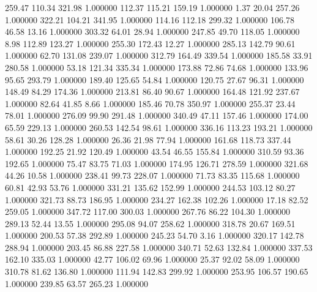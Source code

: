     259.47    110.34    321.98  1.000000
    112.37    115.21    159.19  1.000000
      1.37     20.04    257.26  1.000000
    322.21    104.21    341.95  1.000000
    114.16    112.18    299.32  1.000000
    106.78     46.58     13.16  1.000000
    303.32     64.01     28.94  1.000000
    247.85     49.70    118.05  1.000000
      8.98    112.89    123.27  1.000000
    255.30    172.43     12.27  1.000000
    285.13    142.79     90.61  1.000000
     62.70    131.08    239.07  1.000000
    312.79    164.49    339.54  1.000000
    185.58     33.91    280.58  1.000000
     53.18    121.34    335.34  1.000000
    173.88     72.86     74.68  1.000000
    133.96     95.65    293.79  1.000000
    189.40    125.65     54.84  1.000000
    120.75     27.67     96.31  1.000000
    148.49     84.29    174.36  1.000000
    213.81     86.40     90.67  1.000000
    164.48    121.92    237.67  1.000000
     82.64     41.85      8.66  1.000000
    185.46     70.78    350.97  1.000000
    255.37     23.44     78.01  1.000000
    276.09     99.90    291.48  1.000000
    340.49     47.11    157.46  1.000000
    174.00     65.59    229.13  1.000000
    260.53    142.54     98.61  1.000000
    336.16    113.23    193.21  1.000000
     58.61     30.26    128.28  1.000000
     26.36     21.98     77.94  1.000000
    161.68    118.73    337.44  1.000000
    192.25     21.92    120.49  1.000000
     43.54     46.55    155.84  1.000000
    310.59     93.36    192.65  1.000000
     75.47     83.75     71.03  1.000000
    174.95    126.71    278.59  1.000000
    321.68     44.26     10.58  1.000000
    238.41     99.73    228.07  1.000000
     71.73     83.35    115.68  1.000000
     60.81     42.93     53.76  1.000000
    331.21    135.62    152.99  1.000000
    244.53    103.12     80.27  1.000000
    321.73     88.73    186.95  1.000000
    234.27    162.38    102.26  1.000000
     17.18     82.52    259.05  1.000000
    347.72    117.00    300.03  1.000000
    267.76     86.22    104.30  1.000000
    289.13     52.44     13.55  1.000000
    295.08     94.07    258.62  1.000000
    318.78     20.67    169.51  1.000000
    200.53     57.38    292.89  1.000000
    245.23     54.70      3.16  1.000000
    320.17    142.78    288.94  1.000000
    203.45     86.88    227.58  1.000000
    340.71     52.63    132.84  1.000000
    337.53    162.10    335.03  1.000000
     42.77    106.02     69.96  1.000000
     25.37     92.02     58.09  1.000000
    310.78     81.62    136.80  1.000000
    111.94    142.83    299.92  1.000000
    253.95    106.57    190.65  1.000000
    239.85     63.57    265.23  1.000000
